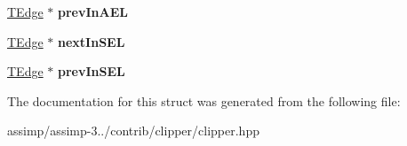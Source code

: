 \begin{DoxyCompactItemize}
\item 
\hypertarget{struct_clipper_lib_1_1_t_edge_a0da02ede8e83c3a4b27a09ebde1dfcf3}{\hyperlink{struct_clipper_lib_1_1_t_edge}{T\+Edge} $\ast$ {\bfseries prev\+In\+A\+E\+L}}\label{struct_clipper_lib_1_1_t_edge_a0da02ede8e83c3a4b27a09ebde1dfcf3}

\item 
\hypertarget{struct_clipper_lib_1_1_t_edge_aa98ac28e25e2a0bf4001ca9547ea0ae8}{\hyperlink{struct_clipper_lib_1_1_t_edge}{T\+Edge} $\ast$ {\bfseries next\+In\+S\+E\+L}}\label{struct_clipper_lib_1_1_t_edge_aa98ac28e25e2a0bf4001ca9547ea0ae8}

\item 
\hypertarget{struct_clipper_lib_1_1_t_edge_aead630eae0633921989272f74d7d169b}{\hyperlink{struct_clipper_lib_1_1_t_edge}{T\+Edge} $\ast$ {\bfseries prev\+In\+S\+E\+L}}\label{struct_clipper_lib_1_1_t_edge_aead630eae0633921989272f74d7d169b}

\end{DoxyCompactItemize}


The documentation for this struct was generated from the following file\+:\begin{DoxyCompactItemize}
\item 
assimp/assimp-\/3../contrib/clipper/clipper.\+hpp\end{DoxyCompactItemize}
